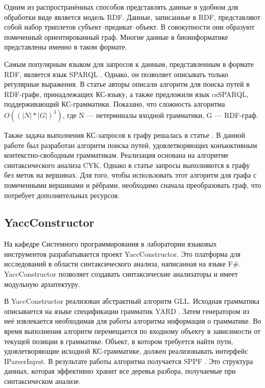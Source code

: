 \documentclass[14pt]{matmex-diploma}
\begin{document}
Одним из распространённых способов представлять данные в удобном для обработки виде является модель RDF. Данные, записанные в RDF, представляют собой набор триплетов субъект--предикат--объект. В совокупности они образуют помеченный ориентированный граф. Многие данные в биоинформатике представлены именно в таком формате.

Самым популярным языком для запросов к данным, представленным в формате RDF, является язык SPARQL \cite{prud2008sparql}. Однако, он позволяет описывать только регулярные выражения. В статье \cite{zhang2016context} авторы описали алгоритм для поиска путей в RDF-графе, принадлежащих КС-языку, а также предложили язык csSPARQL, поддерживающий КС-грамматики. Показано, что сложность алгоритма $O((|N|*|G|)^3)$, где N --- нетерминалы входной грамматики, G --- RDF-граф.

Также задача выполнения КС-запросов к графу решалась в статье  \cite{hellings2014conjunctive}. В данной работе был разработан алгоритм поиска путей, удовлетворяющих конъюктивным контекстно-свободным грамматикам. Реализация основана на алгоритме синтаксического анализа CYK. Однако в статье запросы выполняются к графу без меток на вершинах. Для того, чтобы использовать этот алгоритм для графа с помеченными вершинами и рёбрами, необходимо сначала преобразовать граф, что потребует дополнительных ресурсов.

\subsection{YaccConstructor}

На кафедре Системного программирования в лаборатории языковых инструментов разрабатывается проект YaccConstructor. Это платформа для исследований в области синтаксического анализа, написанная на языке F\#. YaccConstructor позволяет создавать синтаксические анализаторы и имеет модульную архитектуру.

В YaccConstructor реализован абстрактный алгоритм GLL. Исходная грамматика описывается на языке спецификации грамматик YARD \cite{YARD}. Затем генератором из неё извлекается необходимая для работы алгоритма информация о грамматике. Во время выполнения алгоритм перемещается по входному объекту в зависимости от текущей позиции в грамматике. Объект, в котором требуется найти пути, удовлетворяющие исходной КС-грамматике, должен реализовывать интерфейс IParserInput. В результате работы алгоритма получается SPPF \cite{rekers1992parser}. Это структура данных, которая эффективно хранит все деревья разбора, получаемые при синтаксическом анализе.
\end{document}
